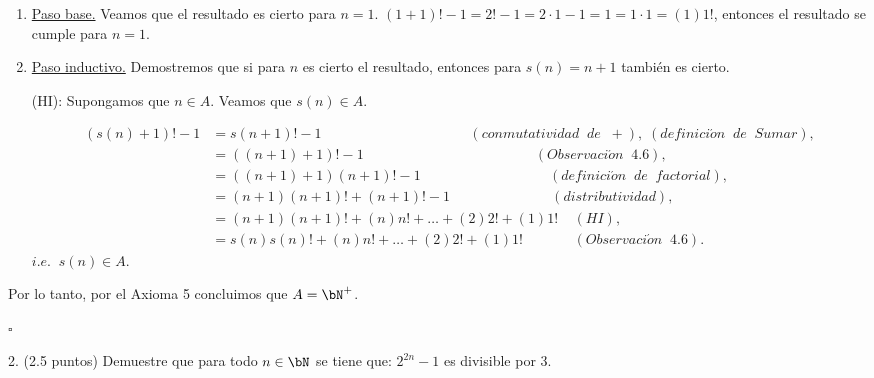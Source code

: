 \documentclass[letterpaper,11pt]{article}
\begin{document}
  \begin{adjustwidth}{1cm}{0cm}
    \begin{enumerate}[1.]
      \item \underline{Paso base.} Veamos que el resultado es cierto para $n = 1$. \newline
        $(1 + 1)! - 1 = 2! - 1 = 2 \cdot 1 - 1 = 1 = 1 \cdot 1 = (1)1!$,
        entonces el resultado se cumple para $n = 1$.
      \item \underline{Paso inductivo.} Demostremos que si para $n$ es cierto el resultado,
       entonces para $s(n) = n + 1$ también es cierto. \newline

      (HI): Supongamos que $n \in A$. Veamos que $s(n) \in A$.

      \begin{align*}
        (s(n) + 1)! - 1 &= s(n+1)! -1  \;\;\;\;\;\;\;\;\;\;\;\;\;\;\;\;\;\;\;\;\;\;\;\;\;\;\;\;\;\;\;\;\;\;\;\;\;\; (conmutatividad \;\; de \;\; +), \; (definici\acute{o}n \;\; de \;\; Sumar), \\
        &= ((n + 1) + 1)! - 1 \;\;\;\;\;\;\;\;\;\;\;\;\;\;\;\;\;\;\;\;\;\;\;\;\;\;\;\;\;\;\;\;\;\;\;\;\;\;\;\;\;\;\;\; (Observaci\acute{o}n \;\; 4.6), \\
        &= ((n + 1) + 1) (n + 1)! - 1  \;\;\;\;\;\;\;\;\;\;\;\;\;\;\;\;\;\;\;\;\;\;\;\;\;\;\;\;\;\;\;\;\;  (definici\acute{o}n \;\; de \;\; factorial), \\
        &= (n + 1) (n + 1)! + (n + 1)! - 1  \;\;\;\;\;\;\;\;\;\;\;\;\;\;\;\;\;\;\;\;\;\;\;\;\;\; (distributividad), \\
        &= (n + 1) (n + 1)! + (n)n! + \dotsc + (2)2! + (1)1!  \;\;\;\; (HI), \\
        &= s(n) s(n)! + (n)n! + \dotsc + (2)2! + (1)1!  \;\;\;\;\;\;\;\;\;\;\;\;\; (Observaci\acute{o}n \;\; 4.6).
      \end{align*}
      $i.e. \;\; s(n) \in A$.
    \end{enumerate}
  \end{adjustwidth}

  Por lo tanto, por el Axioma 5 concluimos que $A = \bN^+$.

  \begin{flushright}
    $\square$
  \end{flushright}

  2. (2.5 puntos) Demuestre que para todo $n \in \bN$ se tiene que: $2^{2n} - 1$ es divisible por 3. \newline
\end{document}
